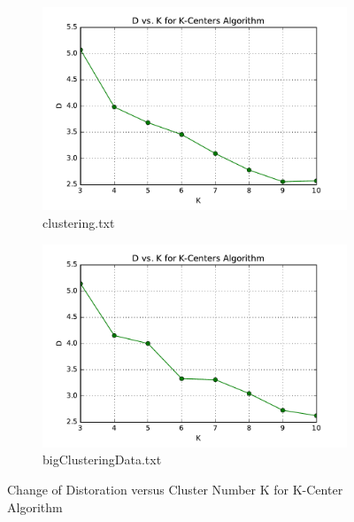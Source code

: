 \begin{figure}[H]
\centering
\centering
        \begin{subfigure}[b]{0.49\textwidth}
            \centering
            \includegraphics[width=\textwidth]{./figures/loss_clustering_kCenter.pdf}
            \caption{clustering.txt}\label{fig:6a}
        \end{subfigure}
        \hfill
        \begin{subfigure}[b]{0.49\textwidth}  
            \centering 
            \includegraphics[width=\textwidth]{./figures/loss_bigClustering_kCenter.pdf}
            \caption{bigClusteringData.txt}\label{fig:6b}
        \end{subfigure}
\caption{Change of Distoration versus Cluster Number K for K-Center Algorithm}
\label{fig:k-means-loss} 
\end{figure}

